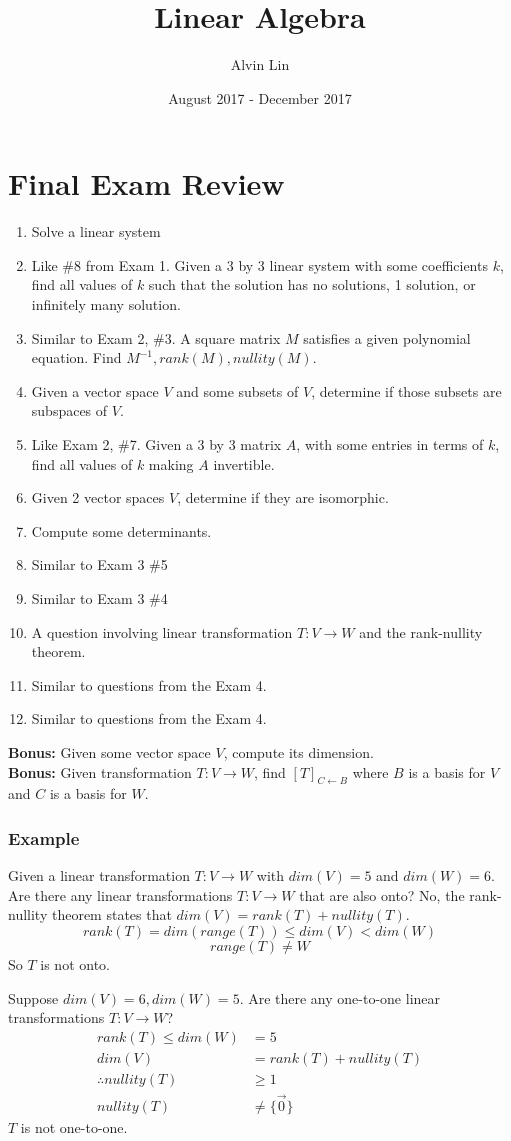 \documentclass{math}
\title{Linear Algebra}
\author{Alvin Lin}
\date{August 2017 - December 2017}
\begin{document}
\maketitle

\section*{Final Exam Review}
\begin{enumerate}
  \item Solve a linear system
  \item Like \#8 from Exam 1. Given a 3 by 3 linear system with some
  coefficients \( k \), find all values of \( k \) such that the solution has
  no solutions, 1 solution, or infinitely many solution.
  \item Similar to Exam 2, \#3. A square matrix \( M \) satisfies a given
  polynomial equation. Find \( M^{-1}, rank(M), nullity(M) \).
  \item Given a vector space \( V \) and some subsets of \( V \), determine if
  those subsets are subspaces of \( V \).
  \item Like Exam 2, \#7. Given a 3 by 3 matrix \( A \), with some entries in
  terms of \( k \), find all values of \( k \) making \( A \) invertible.
  \item Given 2 vector spaces \( V \), determine if they are isomorphic.
  \item Compute some determinants.
  \item Similar to Exam 3 \#5
  \item Similar to Exam 3 \#4
  \item A question involving linear transformation \( T:V\to W \) and the
  rank-nullity theorem.
  \item Similar to questions from the Exam 4.
  \item Similar to questions from the Exam 4.
\end{enumerate}
\textbf{Bonus:} Given some vector space \( V \), compute its dimension. \\
\textbf{Bonus:} Given transformation \( T:V\to W \), find
\( [T]_{C\leftarrow B} \) where \( B \) is a basis for \( V \) and \( C \) is a
basis for \( W \).

\subsubsection*{Example}
Given a linear transformation \( T:V\to W \) with \( dim(V) = 5 \) and
\( dim(W) = 6 \). Are there any linear transformations \( T:V\to W \) that are
also onto? No, the rank-nullity theorem states that
\( dim(V) = rank(T)+nullity(T) \).
\[ rank(T) = dim(range(T)) \le dim(V) < dim(W) \]
\[ range(T) \ne W \]
So \( T \) is not onto. \par
Suppose \( dim(V) = 6, dim(W) = 5 \). Are there any one-to-one linear
transformations \( T:V\to W \)?
\begin{align*}
  rank(T) \le dim(W) &= 5 \\
  dim(V) &= rank(T)+nullity(T) \\
  \therefore nullity(T) &\ge 1 \\
  nullity(T) &\ne \{\vec{0}\}
\end{align*}
\( T \) is not one-to-one.
\end{document}
